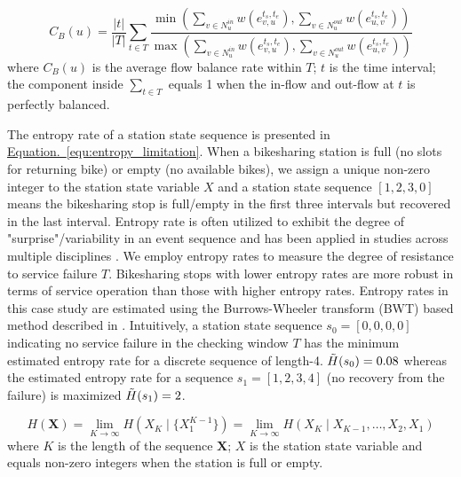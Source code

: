 \documentclass[a4paper,fleqn]{cas-sc}
\begin{document}
\begin{equation}
C_B(u) = \frac{|t|}{|T|}\sum\limits_{t\in T}\frac{\min(\sum\limits_{v\in N_{u}^{in}}w(e_{v,u}^{t_{s},t_{e}}),\sum\limits_{v\in N_{u}^{out}}w(e_{u,v}^{t_{s},t_{e}}))}{\max(\sum\limits_{v\in N_{u}^{in}}w(e_{v,u}^{t_{s},t_{e}}),\sum\limits_{v\in N_{u}^{out}}w(e_{u,v}^{t_{s},t_{e}}))}
\label{equ:balance_rate}
\end{equation}
\indent where $C_B(u)$ is the average flow balance rate within $T$; $t$ is the time interval; the component inside $\sum\limits_{t\in T}$ equals 1 when the in-flow and out-flow at $t$ is perfectly balanced.
\newline

The entropy rate of a station state sequence is presented in \hyperref[equ:entropy_limitation]{Equation.~\ref{equ:entropy_limitation}}. When a bikesharing station is full (no slots for returning bike) or empty (no available bikes), we assign a unique non-zero integer to the station state variable $X$ and a station state sequence $[1,2,3,0]$ means the bikesharing stop is full/empty in the first three intervals but recovered in the last interval. Entropy rate is often utilized to exhibit the degree of "surprise"/variability in an event sequence and has been applied in studies across multiple disciplines \citep{li2010blind,liu2011entropy,liu2013entropy,goulet2017measuring}. We employ entropy rates to measure the degree of resistance to service failure $T$. Bikesharing stops with lower entropy rates are more robust in terms of service operation than those with higher entropy rates. Entropy rates in this case study are estimated using the Burrows-Wheeler transform (BWT) based method described in \cite{lei2020inferring}. Intuitively, a station state sequence $s_0= [0,0,0,0]$ indicating no service failure in the checking window $T$ has the minimum estimated entropy rate for a discrete sequence of length-4. $\Tilde{H}(s_0)=0.08$ whereas the estimated entropy rate for a sequence $s_1 = [1,2,3,4]$ (no recovery from the failure) is maximized $\Tilde{H}(s_1)=2$.

\begin{equation}
H(\mathbf{X})= \lim _{K \rightarrow \infty}H(X_{K} \mid \{X_{1}^{K-1}\}) =\lim _{K \rightarrow \infty} H\left(X_{K} \mid X_{K-1}, \ldots, X_{2}, X_{1}\right)
\label{equ:entropy_limitation}
\end{equation}
\indent where $K$ is the length of the sequence $\mathbf{X}$; $X$ is the station state variable and equals non-zero integers when the station is full or empty.
\end{document}
